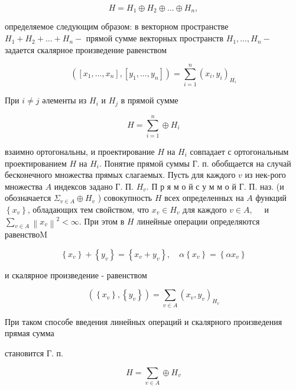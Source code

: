 \documentclass[10pt]{article}
\begin{document}
\[

H=H_{1} \oplus H_{2} \oplus \ldots \oplus H_{n},

\]



определяемое следующим образом: в векторном пространстве $H_{1}+H_{2}+\ldots+H_{n}-$ прямой сумме векторных пространств $H_{1}, \ldots, H_{n}-$ задается скалярное произведение равенством



\[

\left(\left[x_{1}, \ldots, x_{n}\right],\left[y_{1}, \ldots, y_{n}\right]\right)=\sum_{i=1}^{n}\left(x_{i}, y_{i}\right)_{H_{i}}

\]



При $i \neq j$ әлементы из $H_{i}$ и $H_{j}$ в прямой сумме



\[

H=\sum_{i=1}^{n} \oplus H_{i}

\]



взаимно ортогональны, и проектирование $H$ на $H_{i}$ совпадает с ортогональным проектированием $H$ на $H_{i}$. Понятие прямой суммы $Г$. п. обобщается на случай бесконечного множества прямых слагаемых. Пусть для каждого $v$ из нек-рого множества $A$ индексов задано Г. П. $H_{v}$. П р я м о й с у м м о й Г. П. наз. (и обозначается $\Sigma_{v \in A} \oplus H_{v}$ ) совокупность $H$ всех определенных на $A$ функций $\left\{x_{v}\right\}$, обладающих тем свойством, что $x_{v} \in H_{v}$ для каждого $v \in A, \quad$ и $\sum_{v \in A}\left\|x_{v}\right\|^{2}<\infty$. При этом в $H$ линейные операции определяются равенствоM



\[

\left\{x_{v}\right\}+\left\{y_{v}\right\}=\left\{x_{v}+y_{v}\right\}, \quad \alpha\left\{x_{v}\right\}=\left\{\alpha x_{v}\right\}

\]



и скалярное произведение - равенством



\[

\left(\left\{x_{v}\right\},\left\{y_{v}\right\}\right)=\sum_{v \in A}\left(x_{v}, y_{v}\right)_{H_{v}}

\]



При таком способе введения линейных операций и скалярного произведения прямая сумма



становится Г. п.



\[

H=\sum_{v \in A} \oplus H_{v}

\]
\end{document}
